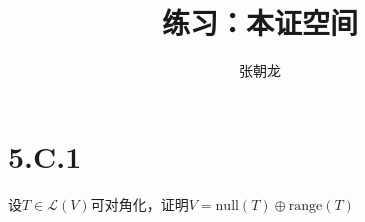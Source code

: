 \documentclass[10pt,a4paper,UTF8]{article}
\author{张朝龙}
\date{}
\title{练习：本证空间}
\begin{document}
\maketitle
\tableofcontents
{}


\section{5.C.1}
\label{sec:orge84f6c2}


\begin{problem}
设\(T\in \mathcal{L}(V)\)可对角化，证明\(V = \mathrm{null}(T) \oplus \mathrm{range}(T)\)
\end{problem}
\end{document}
